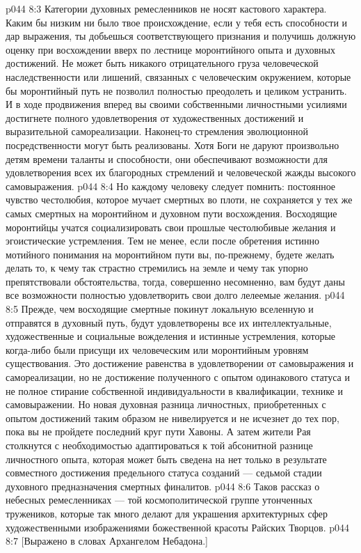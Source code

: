 \vs p044 8:3 \pc Категории духовных ремесленников не носят кастового характера. Каким бы низким ни было твое происхождение, если у тебя есть способности и дар выражения, ты добьешься соответствующего признания и получишь должную оценку при восхождении вверх по лестнице моронтийного опыта и духовных достижений. Не может быть никакого отрицательного груза человеческой наследственности или лишений, связанных с человеческим окружением, которые бы моронтийный путь не позволил полностью преодолеть и целиком устранить. И в ходе продвижения вперед вы своими собственными личностными усилиями достигнете полного удовлетворения от художественных достижений и выразительной самореализации. Наконец\hyp{}то стремления эволюционной посредственности могут быть реализованы. Хотя Боги не даруют произвольно детям времени таланты и способности, они обеспечивают возможности для удовлетворения всех их благородных стремлений и человеческой жажды высокого самовыражения.
\vs p044 8:4 Но каждому человеку следует помнить: постоянное чувство честолюбия, которое мучает смертных во плоти, не сохраняется у тех же самых смертных на моронтийном и духовном пути восхождения. Восходящие моронтийцы учатся социализировать свои прошлые честолюбивые желания и эгоистические устремления. Тем не менее, если после обретения истинно мотийного понимания на моронтийном пути вы, по\hyp{}прежнему, будете желать делать то, к чему так страстно стремились на земле и чему так упорно препятствовали обстоятельства, тогда, совершенно несомненно, вам будут даны все возможности полностью удовлетворить свои долго лелеемые желания.
\vs p044 8:5 Прежде, чем восходящие смертные покинут локальную вселенную и отправятся в духовный путь, будут удовлетворены все их интеллектуальные, художественные и социальные вожделения и истинные устремления, которые когда\hyp{}либо были присущи их человеческим или моронтийным уровням существования. Это достижение равенства в удовлетворении от самовыражения и самореализации, но не достижение полученного с опытом одинакового статуса и не полное стирание собственной индивидуальности в квалификации, технике и самовыражении. Но новая духовная разница личностных, приобретенных с опытом достижений таким образом не нивелируется и не исчезнет до тех пор, пока вы не пройдете последний круг пути Хавоны. А затем жители Рая столкнутся с необходимостью адаптироваться к той абсонитной разнице личностного опыта, которая может быть сведена на нет только в результате совместного достижения предельного статуса созданий --- седьмой стадии духовного предназначения смертных финалитов.
\vs p044 8:6 \pc Таков рассказ о небесных ремесленниках --- той космополитической группе утонченных тружеников, которые так много делают для украшения архитектурных сфер художественными изображениями божественной красоты Райских Творцов.
\vsetoff
\vs p044 8:7 [Выражено в словах Архангелом Небадона.]
